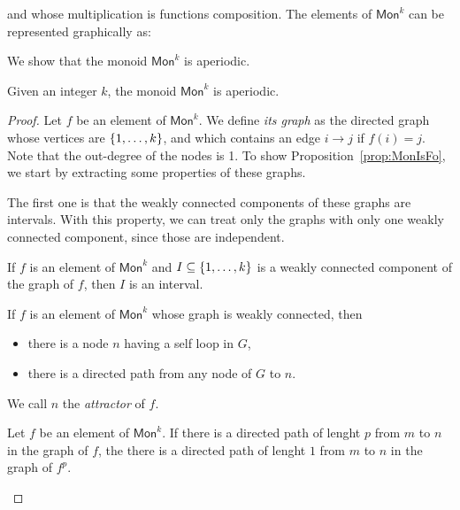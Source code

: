 and whose multiplication is functions composition.  The elements of $\mathsf{Mon}^k$ can be represented graphically as:
     

We show that the monoid $\mathsf{Mon}^k$ is aperiodic.
     \begin{proposition}\label{prop:MonIsFo}
Given an integer $k$, the monoid $\mathsf{Mon}^k$ is aperiodic.     
     \end{proposition}
     
     \begin{proof}
     Let $f$ be an element of $\mathsf{Mon}^k$. We define \emph {its graph} as the directed graph whose vertices are $\{1,\dots, k\}$, and which contains an edge $i\rightarrow j$ if $f(i)=j$. Note that the out-degree of the nodes is 1. To show Proposition~\ref{prop:MonIsFo}, we start by extracting some properties of these graphs.
     
The first one is that the weakly connected components of these graphs are intervals. With this property, we can treat only the graphs with only one weakly connected component, since those are independent. 
     \begin{lemma}
     If $f$ is an element of $\mathsf{Mon}^k$ and $I\subseteq \{1,\dots,k\}$ is a weakly connected component of the graph of $f$, then $I$ is an interval. 
     \end{lemma}
     
     \begin{lemma}
     If $f$ is an element of $\mathsf{Mon}^k$ whose graph is weakly connected, then 
\begin{itemize}
\item there is a node $n$  having a self loop in $G$,
\item there is a directed path from any node of $G$ to $n$. 
\end{itemize}     
 We call $n$ the \emph{attractor} of $f$.    
     \end{lemma}  
    
    \begin{lemma}
    Let $f$ be an element of $\mathsf{Mon}^k$.  If there is a directed path of lenght $p$ from $m$ to $n$ in the graph of $f$, the there is a directed path of lenght $1$ from $m$ to $n$ in the graph of $f^p$.
    \end{lemma}
     \end{proof}